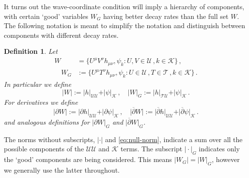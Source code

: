 \documentclass[11pt, a4paper]{amsart}
\numberwithin{equation}{section}
\newtheorem{definition}[theorem]{Definition}
\numberwithin{theorem}{section}
\newcommand{\p}{\partial}
\newcommand{\mn}{{\mu \nu}}
\newcommand{\pgood}{\overline{\partial}}
\newcommand{\UU}{{\mathcal{U} \mathcal{U}}}
\newcommand{\TU}{{\mathcal{T} \mathcal{U}}}
\newcommand{\K}{\mathcal{K}}
\begin{document}
It turns out the wave-coordinate condition will imply a hierarchy of components, with certain `good' variables $W_G$ having better decay rates than the full set $W$. The following notation is meant to simplify the notation and distinguish between components with different decay rates. 
\begin{definition}
Let 
\begin{equation} \begin{split}
W &= \{ U^\mu V^\nu h_\mn , \psi_k : U, V \in \mathcal{U} \,, k \in \K \} \,, \\
\quad W_G & := \{ U^\mu T^\nu h_\mn, \psi_k : U \in \mathcal{U} \,, T \in \mathcal{T} \,, k \in \K \}  \,.
\end{split} \label{eq:def-W-Y} \end{equation}
In particular we define 
$$ \vert W \vert := \vert h \vert_\UU + \vert \psi \vert_\K \,, \quad \vert W \vert_G := \vert h \vert_\TU + \vert \psi \vert_\K \,. $$
For derivatives we define 
$$ \vert \p W \vert := \vert \p h \vert_\UU + \vert \p \psi \vert_\K \,, \quad \vert \pgood W \vert := \vert \pgood h \vert_\UU + \vert \pgood \psi \vert_\K \,.$$
and analogous definitions for $\vert \p W \vert_G$ and $\vert \pgood W \vert_G$. 
\end{definition}
The norms without subscripts, $\vert \cdot \vert$ and \eqref{eq:null-norm}, indicate a sum over all the possible components of the $\UU$ and $\K$ terms. The subscript $\vert \cdot \vert_G$ indicates only the `good' components are being considered. This means $|W_G| = |W|_G$, however we generally use the latter throughout. 
\end{document}
